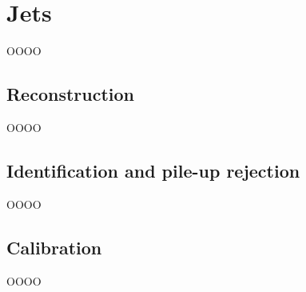 \section{Jets}
\label{heading:Chapter6-section3-1}

OOOO

\subsection{Reconstruction}
\label{heading:Chapter6-section3-2}

OOOO

\subsection{Identification and pile-up rejection}
\label{heading:Chapter6-section3-3}

OOOO

\subsection{Calibration}
\label{heading:Chapter6-section3-4}

OOOO

